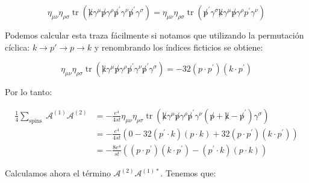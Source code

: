 \begin{equation}
  \eta_{\mu \nu} \eta_{\rho \sigma} \operatorname{tr}\left(\not k \gamma^\mu \not p \gamma^\rho \not p^{\prime} \gamma^\nu \not p^{\prime} \gamma^\sigma\right)=\eta_{\mu \nu} \eta_{\rho \sigma} \operatorname{tr}\left(\not p^{\prime} \gamma^\sigma \not k \gamma^\mu \not p \gamma^\rho p^{\prime} \gamma^\nu\right)
  \end{equation}

Podemos calcular esta traza fácilmente si notamos que utilizando la permutación cíclica: $ k \to p' \to p \to k $ y renombrando los índices ficticios se obtiene:

\begin{equation}
  \eta_{\mu \nu} \eta_{\rho \sigma} \operatorname{tr}\left(\not k \gamma^\mu \not p \gamma^\rho \not p^{\prime} \gamma^\nu \not p^{\prime} \gamma^\sigma\right)=-32\left(p \cdot p^{\prime}\right)\left(k \cdot p^{\prime}\right)
  \end{equation}

Por lo tanto:

\begin{equation}
  \begin{aligned}
  \frac{1}{4} \sum_{\text {spins }} \mathcal{A}^{(1)} \mathcal{A}^{(2)} & =-\frac{e^4}{4 s t} \eta_{\mu \nu} \eta_{\rho \sigma} \operatorname{tr}\left(\not k \gamma^\mu \not p  \gamma^\rho \not p^{\prime} \gamma^\nu\left(\not p+\not k-\not p^{\prime}\right) \gamma^\sigma\right) \\
  & =-\frac{e^4}{4 s t}\left(0-32\left(p^{\prime} \cdot k\right)(p \cdot k)+32\left(p \cdot p^{\prime}\right)\left(k \cdot p^{\prime}\right)\right) \\
  & =-\frac{8 e^4}{s t}\left(\left(p \cdot p^{\prime}\right)\left(k \cdot p^{\prime}\right)-\left(p^{\prime} \cdot k\right)(p \cdot k)\right)
  \end{aligned}
  \end{equation}

Calculamos ahora el término $\mathcal{A}^{(2)} \mathcal{A}^{(1)*}$. Tenemos que:

